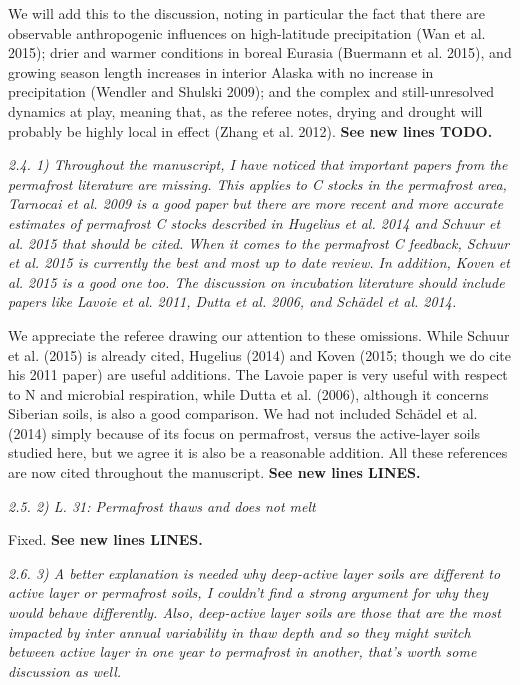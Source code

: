 \documentclass[11pt, oneside]{article}
\begin{document}
We will add this to the discussion, noting in particular the fact that there are observable anthropogenic influences on high-latitude precipitation (Wan et al. 2015); drier and warmer conditions in boreal Eurasia (Buermann et al. 2015), and growing season length increases in interior Alaska with no increase in precipitation (Wendler and Shulski 2009); and the complex and still-unresolved dynamics at play, meaning that, as the referee notes, drying and drought will probably be highly local in effect (Zhang et al. 2012). {\bf See new lines TODO.}

\medskip
{\it 2.4. 1) Throughout the manuscript, I have noticed that important papers from the permafrost literature are missing. This applies to C stocks in the permafrost area, Tarnocai et al. 2009 is a good paper but there are more recent and more accurate estimates of permafrost C stocks described in Hugelius et al. 2014 and Schuur et al. 2015 that should be cited. When it comes to the permafrost C feedback, Schuur et al. 2015 is currently the best and most up to date review. In addition, Koven et al. 2015 is a good one too. The discussion on incubation literature should include papers like Lavoie et al. 2011, Dutta et al. 2006, and Schädel et al. 2014. }

We appreciate the referee drawing our attention to these omissions. While Schuur et al. (2015) is already cited, Hugelius (2014) and Koven (2015; though we do cite his 2011 paper) are useful additions. The Lavoie paper is very useful with respect to N and microbial respiration, while Dutta et al. (2006), although it concerns Siberian soils, is also a good comparison. We had not included Schädel et al. (2014) simply because of its focus on permafrost, versus the active-layer soils studied here, but we agree it is also be a reasonable addition. All these references are now cited throughout the manuscript. {\bf See new lines LINES.}

\medskip
{\it 2.5. 2) L. 31: Permafrost thaws and does not melt }

Fixed. {\bf See new lines LINES.}

\medskip
{\it 2.6. 3) A better explanation is needed why deep-active layer soils are different to active layer or permafrost soils, I couldn't find a strong argument for why they would behave differently. Also, deep-active layer soils are those that are the most impacted by inter annual variability in thaw depth and so they might switch between active layer in one year to permafrost in another, that's worth some discussion as well. }
\end{document}
